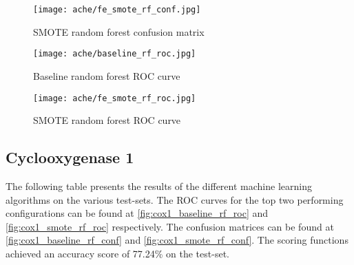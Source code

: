 \begin{figure}[H]
    \begin{center}
        \caption[]{SMOTE random forest confusion matrix}
        \label{fig:ache_smote_rf_conf}
        \texttt{[image: ache/fe\_smote\_rf\_conf.jpg]}
    \end{center}

\end{figure}

\begin{figure}[H]
    \begin{center}
        \caption[]{Baseline random forest ROC curve}
        \label{fig:ache_baseline_rf_roc}
        \texttt{[image: ache/baseline\_rf\_roc.jpg]}
    \end{center}

\end{figure}

\begin{figure}[H]
    \begin{center}
        \caption[]{SMOTE random forest ROC curve}
        \label{fig:ache_smote_rf_roc}
        \texttt{[image: ache/fe\_smote\_rf\_roc.jpg]}
    \end{center}
\end{figure}


\subsection{Cyclooxygenase 1}
The following table presents the results of the different machine learning algorithms on the various
test-sets. The ROC curves for the top two performing configurations can be found at \ref{fig:cox1_baseline_rf_roc} and \ref{fig:cox1_smote_rf_roc}
respectively. The confusion matrices can be found at \ref{fig:cox1_baseline_rf_conf} and \ref{fig:cox1_smote_rf_conf}.
The scoring functions achieved an accuracy score of 77.24\% on the test-set.

